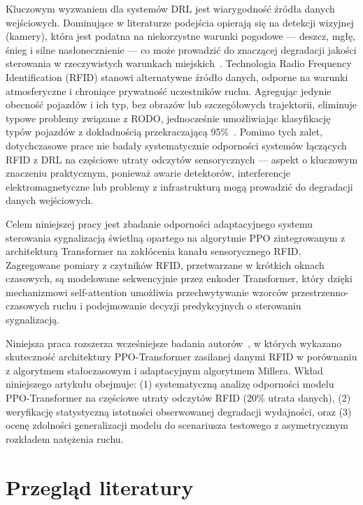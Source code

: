 \documentclass[10pt,a4paper]{article}
\begin{document}
Kluczowym wyzwaniem dla systemów DRL jest wiarygodność źródła danych wejściowych. Dominujące w literaturze podejścia opierają się na detekcji wizyjnej (kamery), która jest podatna na niekorzystne warunki pogodowe --- deszcz, mgłę, śnieg i silne nasłonecznienie --- co może prowadzić do znaczącej degradacji jakości sterowania w rzeczywistych warunkach miejskich~\cite{ref3}. Technologia Radio Frequency Identification (RFID) stanowi alternatywne źródło danych, odporne na warunki atmosferyczne i chroniące prywatność uczestników ruchu. Agregując jedynie obecność pojazdów i ich typ, bez obrazów lub szczegółowych trajektorii, eliminuje typowe problemy związane z RODO, jednocześnie umożliwiając klasyfikację typów pojazdów z dokładnością przekraczającą 95\%~\cite{ref3}. Pomimo tych zalet, dotychczasowe prace nie badały systematycznie odporności systemów łączących RFID z DRL na częściowe utraty odczytów sensorycznych --- aspekt o kluczowym znaczeniu praktycznym, ponieważ awarie detektorów, interferencje elektromagnetyczne lub problemy z infrastrukturą mogą prowadzić do degradacji danych wejściowych.

Celem niniejszej pracy jest zbadanie odporności adaptacyjnego systemu sterowania sygnalizacją świetlną opartego na algorytmie PPO zintegrowanym z architekturą Transformer na zakłócenia kanału sensorycznego RFID. Zagregowane pomiary z czytników RFID, przetwarzane w krótkich oknach czasowych, są modelowane sekwencyjnie przez enkoder Transformer, który dzięki mechanizmowi self-attention umożliwia przechwytywanie wzorców przestrzenno-czasowych ruchu i podejmowanie decyzji predykcyjnych o sterowaniu sygnalizacją.

Niniejsza praca rozszerza wcześniejsze badania autorów~\cite{ref16}, w których wykazano skuteczność architektury PPO-Transformer zasilanej danymi RFID w porównaniu z algorytmem stałoczasowym i adaptacyjnym algorytmem Millera. Wkład niniejszego artykułu obejmuje: (1) systematyczną analizę odporności modelu PPO-Transformer na częściowe utraty odczytów RFID (20\% utrata danych), (2) weryfikację statystyczną istotności obserwowanej degradacji wydajności, oraz (3) ocenę zdolności generalizacji modelu do scenariusza testowego z asymetrycznym rozkładem natężenia ruchu.

\section{Przegląd literatury}
\end{document}
